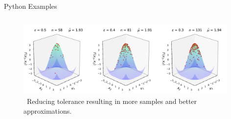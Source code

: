 \documentclass[final]{beamer}
\newlength{\onecolwid}
\newlength{\twocolwid}
\newlength{\threecolwid}
\begin{document}
\begin{frame}[t]
\begin{columns}[t]
\begin{column}{\threecolwid}
\begin{column}{\threecolwid}\vspace{-.8in}
\begin{block}{Python Examples}
    \begin{column}{\onecolwid}
        
    \end{column}
    \begin{column}{\twocolwid}
    \vspace{-2ex}
        \begin{figure}
            \includegraphics[width=0.98\textwidth]{Images/Three_3d_SurfaceScatters.png}
            \caption{\ Reducing tolerance resulting in more samples and better approximations.}
        \end{figure}
    \end{column}
\end{block}
\end{column}
\end{column}


\end{columns}
\end{frame}
\end{document}
